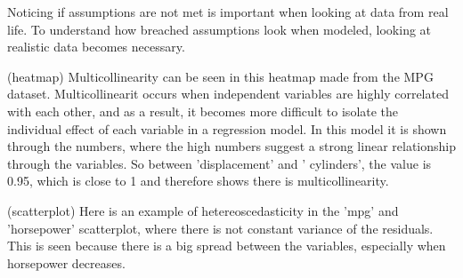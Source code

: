 Noticing if assumptions are not met is important when looking at data from real life.
To understand how breached assumptions look when modeled, looking at realistic data becomes necessary. \newline

(heatmap)
Multicollinearity can be seen in this heatmap made from the MPG dataset. Multicollinearit occurs when independent variables are highly correlated with each other, and as a result, it becomes more difficult to isolate the individual effect of each variable in a regression model.
In this model it is shown through the numbers, where the high numbers suggest a strong linear relationship through the variables. So between 'displacement' and ' cylinders', the value is 0.95, which is close to 1 and therefore shows there is multicollinearity. \newline

(scatterplot)
Here is an example of hetereoscedasticity in the 'mpg' and 'horsepower' scatterplot, where there is not constant variance of the residuals. This is seen because there is a big spread between the variables, especially when horsepower decreases.   
